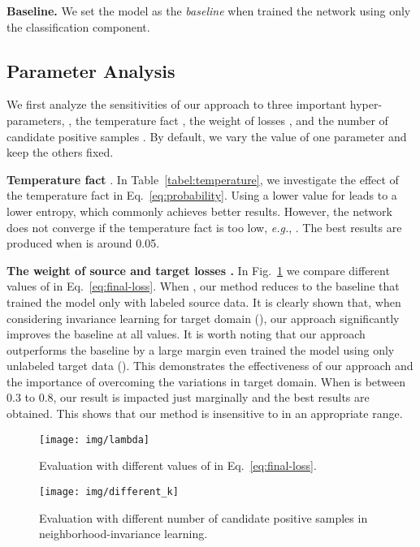\documentclass[10pt,twocolumn,letterpaper]{article}
\begin{document}
\textbf{Baseline.} We set the model as the \emph{baseline} when trained the network using only the classification component.


\subsection{Parameter Analysis}

We first analyze the sensitivities of our approach to three important hyper-parameters, \ie, the temperature fact , the weight of losses , and the number of candidate positive samples . By default, we vary the value of one parameter and keep the others fixed.


\textbf{Temperature fact }. In Table~\ref{tabel:temperature}, we investigate the effect of the temperature fact  in Eq.~\ref{eq:probability}. Using a lower value for  leads to a lower entropy, which commonly achieves better results. However, the network does not converge if the temperature fact is too low, \emph{e.g.}, . The best results are produced when  is around 0.05.


\textbf{The weight of source and target losses .} In Fig.~\ref{fig:labmda} we compare different values of  in Eq.~\ref{eq:final-loss}. When , our method reduces to the baseline that trained the model only with labeled source data. It is clearly shown that, when considering invariance learning for target domain (), our approach significantly improves the baseline at all values. It is worth noting that our approach outperforms the baseline by a large margin even trained the model using only unlabeled target data (). This demonstrates the effectiveness of our approach and the importance of overcoming the variations in target domain. When  is between 0.3 to 0.8, our result is impacted just marginally and the best results are obtained. This shows that our method is insensitive to  in an appropriate range.



\begin{figure}[!t]
\centering
\texttt{[image: img/lambda]}
\caption{Evaluation with different values of  in Eq.~\ref{eq:final-loss}.}
\label{fig:labmda}
\end{figure}




\begin{figure}[!t]
\centering
\texttt{[image: img/different\_k]}
\caption{Evaluation with different number of candidate positive samples in neighborhood-invariance learning.}
\label{fig:different_k}
\end{figure}
\end{document}
